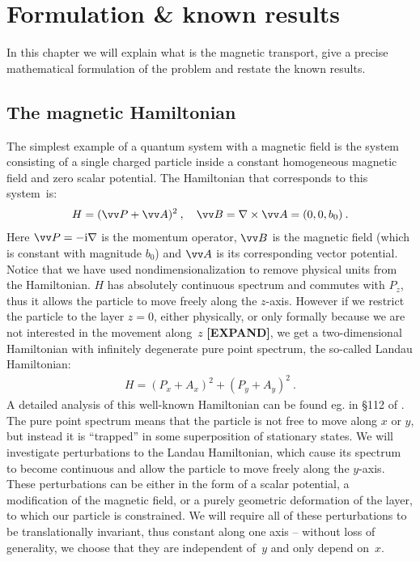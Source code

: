 \chapter{Formulation \& known results}
In this chapter we will explain what is the magnetic transport, give a precise mathematical formulation of the problem and restate the known results.

\section{The magnetic Hamiltonian}
The simplest example of a quantum system with a magnetic field is the system consisting of a single charged particle inside a constant homogeneous magnetic field and zero scalar potential. The Hamiltonian that corresponds to this system~is:
\begin{align*}
    H = (\vv P + \vv A)^2 \: , \quad
    \vv B = \nabla \times \vv A = (0, 0, b_0) \: .
\end{align*}
Here $\vv P = -\i \nabla$ is the momentum operator, $\vv B$ is the magnetic field (which is constant with magnitude $b_0$) and $\vv A$ is its corresponding vector potential. Notice that we have used nondimensionalization to remove physical units from the Hamiltonian. $H$ has absolutely continuous spectrum and commutes with $P_z$, thus it allows the particle to move freely along the $z$-axis. However if we restrict the particle to the layer $z=0$, either physically, or only formally because we are not interested in the movement along~$z$ \textbf{[EXPAND]}, we get a two-dimensional Hamiltonian with infinitely degenerate pure point spectrum, the so-called Landau Hamiltonian:
\begin{align*}
    H = (P_x + A_x)^2 + (P_y + A_y)^2 \: .
\end{align*}
A detailed analysis of this well-known Hamiltonian can be found eg. in §112 of \cite{LandauLifshitz3}. The pure point spectrum means that the particle is not free to move along $x$ or $y$, but instead it is “trapped” in some superposition of stationary states. We will investigate perturbations to the Landau Hamiltonian, which cause its spectrum to become continuous and allow the particle to move freely along the $y$-axis. These perturbations can be either in the form of a scalar potential, a modification of the magnetic field, or a purely geometric deformation of the layer, to which our particle is constrained. We will require all of these perturbations to be translationally invariant, thus constant along one axis – without loss of generality, we choose that they are independent of~$y$ and only depend on~$x$.

